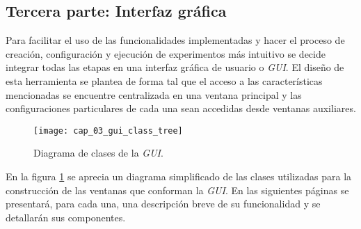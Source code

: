 \documentclass[\main/main.tex]{subfiles}
\begin{document}
		\subsection{Tercera parte: Interfaz gráfica}
		\label{sub:03_gui}
			Para facilitar el uso de las funcionalidades implementadas y hacer el proceso de creación, configuración y ejecución de experimentos más intuitivo se decide integrar todas las etapas en una interfaz gráfica de usuario o \textit{GUI}. El diseño de esta herramienta se plantea de forma tal que el acceso a las características mencionadas se encuentre centralizada en una ventana principal y las configuraciones particulares de cada una sean accedidas desde ventanas auxiliares. 
			\begin{figure}[H]
				\centering
				\texttt{[image: cap\_03\_gui\_class\_tree]}
				\caption{Diagrama de clases de la \textit{GUI}.}
				\label{fig:03_gui_class_tree}
			\end{figure} 

			En la figura \ref{fig:03_gui_class_tree} se aprecia un diagrama simplificado de las clases utilizadas para la construcción de las ventanas que conforman la \textit{GUI}. En las siguientes páginas se presentará, para cada una, una descripción breve de su funcionalidad y se detallarán sus componentes.
\end{document}
